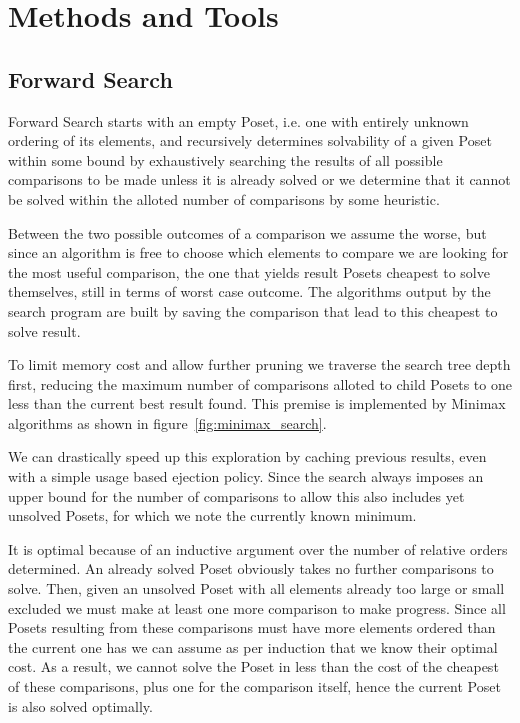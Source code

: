\documentclass[10pt,journal,compsoc]{IEEEtran}
\begin{document}
\section{Methods and Tools}
\subsection{Forward Search}\label{chapter:forward_search}
Forward Search starts with an empty Poset, i.e. one with entirely unknown ordering of its elements,
and recursively determines solvability of a given Poset within some bound by exhaustively searching
the results of all possible comparisons to be made unless it is already solved or we determine that
it cannot be solved within the alloted number of comparisons by some heuristic.

Between the two possible outcomes of a comparison we assume the worse, but since an algorithm is
free to choose which elements to compare we are looking for the most useful comparison, the one that
yields result Posets cheapest to solve themselves, still in terms of worst case outcome. The
algorithms output by the search program are built by saving the comparison that lead to this
cheapest to solve result.

To limit memory cost and allow further pruning we traverse the search tree depth first, reducing the
maximum number of comparisons alloted to child Posets to one less than the current best result
found. This premise is implemented by Minimax algorithms as shown in
figure~\ref{fig:minimax_search}.

We can drastically speed up this exploration by caching previous results, even with a simple usage
based ejection policy. Since the search always imposes an upper bound for the number of comparisons
to allow this also includes yet unsolved Posets, for which we note the currently known minimum.

It is optimal because of an inductive argument over the number of relative orders determined. An
already solved Poset obviously takes no further comparisons to solve. Then, given an unsolved Poset
with all elements already too large or small excluded we must make at least one more comparison to
make progress. Since all Posets resulting from these comparisons must have more elements ordered
than the current one has we can assume as per induction that we know their optimal cost. As a result, we
cannot solve the Poset in less than the cost of the cheapest of these comparisons, plus one for the
comparison itself, hence the current Poset is also solved optimally.
\end{document}
